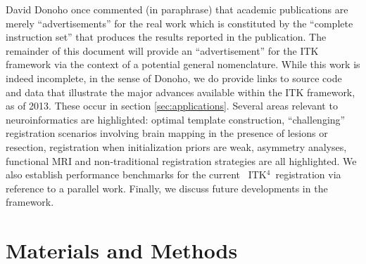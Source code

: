 \documentclass{frontiersSCNS}
\newcommand{\tk}{~ITK$^{\text{4}}$~}
\begin{document}



David Donoho once commented (in paraphrase) that academic publications
are merely ``advertisements'' for the real work which is constituted
by the ``complete instruction set'' that produces the results reported
in the publication.  The remainder of this document will provide an
``advertisement'' for the ITK framework via the context of a potential
general nomenclature.  While this work is indeed incomplete, in the
sense of Donoho, we do provide links to source code and data that
illustrate the major advances available within the ITK framework, as
of 2013.  These occur in section \ref{sec:applications}.  Several
areas relevant to neuroinformatics are highlighted: optimal template
construction, ``challenging'' registration scenarios involving brain
mapping in the presence of lesions or resection, registration when
initialization priors are weak, asymmetry analyses, functional MRI and
non-traditional registration strategies are all highlighted.  We also
establish performance benchmarks for the current \tk registration via
reference to a parallel work.  Finally, we discuss future developments
in the framework.

\section{Materials and Methods}
\end{document}
